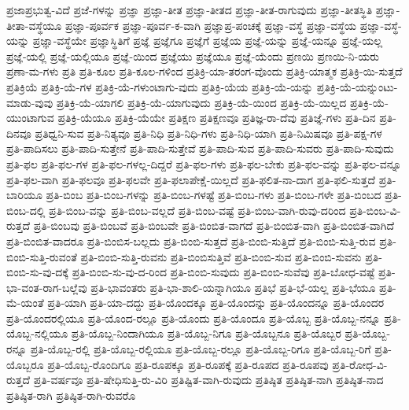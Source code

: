 {ಪ್ರಜಾಪ್ರಭುತ್ವ-ವಿದೆ
ಪ್ರಜೆ-ಗಳನ್ನು
ಪ್ರಜ್ಞಾ
ಪ್ರಜ್ಞಾ-ತೀತ
ಪ್ರಜ್ಞಾ-ತೀತದ
ಪ್ರಜ್ಞಾ-ತೀತ-ರಾಗುವುದು
ಪ್ರಜ್ಞಾ-ತೀತಸ್ಥಿತಿ
ಪ್ರಜ್ಞಾ-ತೀತಾ-ವಸ್ಥೆಯೂ
ಪ್ರಜ್ಞಾ-ಪೂರ್ವಕ
ಪ್ರಜ್ಞಾ-ಪೂರ್ವ-ಕ-ವಾಗಿ
ಪ್ರಜ್ಞಾಪ್ರ-ಪಂಚಕ್ಕೆ
ಪ್ರಜ್ಞಾ-ವಸ್ಥೆ
ಪ್ರಜ್ಞಾ-ವಸ್ಥೆಯ
ಪ್ರಜ್ಞಾ-ವಸ್ಥೆ-ಯನ್ನು
ಪ್ರಜ್ಞಾ-ವಸ್ಥೆಯೇ
ಪ್ರಜ್ಞಾಸ್ಥಿತಿಗೆ
ಪ್ರಜ್ಞೆ
ಪ್ರಜ್ಞೆಗೂ
ಪ್ರಜ್ಞೆಗೆ
ಪ್ರಜ್ಞೆಯ
ಪ್ರಜ್ಞೆ-ಯನ್ನು
ಪ್ರಜ್ಞೆ-ಯನ್ನೂ
ಪ್ರಜ್ಞೆ-ಯಲ್ಲ
ಪ್ರಜ್ಞೆ-ಯಲ್ಲಿ
ಪ್ರಜ್ಞೆ-ಯಲ್ಲಿಯೂ
ಪ್ರಜ್ಞೆ-ಯಿಂದ
ಪ್ರಜ್ಞೆಯು
ಪ್ರಜ್ಞೆಯೂ
ಪ್ರಜ್ಞೆ-ಯೆಂದು
ಪ್ರಣಯಿ
ಪ್ರಣಯಿ-ನಿ-ಯರು
ಪ್ರಣಾ-ಮ-ಗಳು
ಪ್ರತಿ
ಪ್ರತಿ-ಕೂಲ
ಪ್ರತಿ-ಕೂಲ-ಗಳಿಂದ
ಪ್ರತಿಕ್ರಿ-ಯಾ-ತರಂಗ-ವೊಂದು
ಪ್ರತಿಕ್ರಿ-ಯಾತ್ಮಕ
ಪ್ರತಿಕ್ರಿ-ಯಿ-ಸುತ್ತದೆ
ಪ್ರತಿಕ್ರಿಯೆ
ಪ್ರತಿಕ್ರಿ-ಯೆ-ಗಳ
ಪ್ರತಿಕ್ರಿ-ಯೆ-ಗಳುಂಟಾಗು-ವುದು
ಪ್ರತಿಕ್ರಿ-ಯೆಯ
ಪ್ರತಿಕ್ರಿ-ಯೆ-ಯನ್ನು
ಪ್ರತಿಕ್ರಿ-ಯೆ-ಯನ್ನುಂಟು-ಮಾಡು-ವುವು
ಪ್ರತಿಕ್ರಿ-ಯೆ-ಯಾಗಲಿ
ಪ್ರತಿಕ್ರಿ-ಯೆ-ಯಾಗುವುದು
ಪ್ರತಿಕ್ರಿ-ಯೆ-ಯಿಂದ
ಪ್ರತಿಕ್ರಿ-ಯೆ-ಯಿಲ್ಲದ
ಪ್ರತಿಕ್ರಿ-ಯೆ-ಯುಂಟಾಗುವ
ಪ್ರತಿಕ್ರಿ-ಯೆಯೂ
ಪ್ರತಿಕ್ರಿ-ಯೆಯೇ
ಪ್ರತಿಕ್ಷಣ
ಪ್ರತಿಕ್ಷಣವೂ
ಪ್ರತಿಜ್ಞ-ರಾ-ದೆವು
ಪ್ರತಿಜ್ಞೆ-ಗಳು
ಪ್ರತಿ-ದಿನ
ಪ್ರತಿ-ದಿನವೂ
ಪ್ರತಿಧ್ವನಿ-ಸುವ
ಪ್ರತಿ-ನಿತ್ಯವೂ
ಪ್ರತಿ-ನಿಧಿ
ಪ್ರತಿ-ನಿಧಿ-ಗಳು
ಪ್ರತಿ-ನಿಧಿ-ಯಾಗಿ
ಪ್ರತಿ-ನಿಮಿಷವೂ
ಪ್ರತಿ-ಪಕ್ಷ-ಗಳ
ಪ್ರತಿ-ಪಾದಿಸಲು
ಪ್ರತಿ-ಪಾದಿ-ಸುತ್ತೇನೆ
ಪ್ರತಿ-ಪಾದಿ-ಸುತ್ತೇವೆ
ಪ್ರತಿ-ಪಾದಿ-ಸುವ
ಪ್ರತಿ-ಪಾದಿ-ಸುವರು
ಪ್ರತಿ-ಪಾದಿ-ಸುವುದು
ಪ್ರತಿ-ಫಲ
ಪ್ರತಿ-ಫಲ-ಗಳ
ಪ್ರತಿ-ಫಲ-ಗಳಲ್ಲ-ದಿದ್ದರೆ
ಪ್ರತಿ-ಫಲ-ಗಳು
ಪ್ರತಿ-ಫಲ-ಬೇಕು
ಪ್ರತಿ-ಫಲ-ವನ್ನು
ಪ್ರತಿ-ಫಲ-ವನ್ನೂ
ಪ್ರತಿ-ಫಲ-ವಾಗಿ
ಪ್ರತಿ-ಫಲವೂ
ಪ್ರತಿ-ಫಲವೇ
ಪ್ರತಿ-ಫಲಾಪೇಕ್ಷೆ-ಯಿಲ್ಲದೆ
ಪ್ರತಿ-ಫಲಿತ-ನಾ-ದಾಗ
ಪ್ರತಿ-ಫಲಿ-ಸುತ್ತದೆ
ಪ್ರತಿ-ಬಾರಿಯೂ
ಪ್ರತಿ-ಬಿಂಬ
ಪ್ರತಿ-ಬಿಂಬ-ಗಳನ್ನು
ಪ್ರತಿ-ಬಿಂಬ-ಗಳಷ್ಟೆ
ಪ್ರತಿ-ಬಿಂಬ-ಗಳು
ಪ್ರತಿ-ಬಿಂಬ-ಗಳೇ
ಪ್ರತಿ-ಬಿಂಬದ
ಪ್ರತಿ-ಬಿಂಬ-ದಲ್ಲಿ
ಪ್ರತಿ-ಬಿಂಬ-ವನ್ನು
ಪ್ರತಿ-ಬಿಂಬ-ವಲ್ಲದೆ
ಪ್ರತಿ-ಬಿಂಬ-ವಷ್ಟೆ
ಪ್ರತಿ-ಬಿಂಬ-ವಾಗಿ-ರುವು-ದರಿಂದ
ಪ್ರತಿ-ಬಿಂಬ-ವಿ-ರುತ್ತದೆ
ಪ್ರತಿ-ಬಿಂಬವು
ಪ್ರತಿ-ಬಿಂಬವೆ
ಪ್ರತಿ-ಬಿಂಬವೇ
ಪ್ರತಿ-ಬಿಂಬಿತ-ವಾಗದೆ
ಪ್ರತಿ-ಬಿಂಬಿತ-ವಾಗಿ
ಪ್ರತಿ-ಬಿಂಬಿತ-ವಾಗಿದೆ
ಪ್ರತಿ-ಬಿಂಬಿತ-ವಾದರೂ
ಪ್ರತಿ-ಬಿಂಬಿಸ-ಬಲ್ಲದು
ಪ್ರತಿ-ಬಿಂಬಿ-ಸುತ್ತದೆ
ಪ್ರತಿ-ಬಿಂಬಿ-ಸುತ್ತಿದೆ
ಪ್ರತಿ-ಬಿಂಬಿ-ಸುತ್ತಿ-ರುವ
ಪ್ರತಿ-ಬಿಂಬಿ-ಸುತ್ತಿ-ರುವಂತೆ
ಪ್ರತಿ-ಬಿಂಬಿ-ಸುತ್ತಿ-ರುವನು
ಪ್ರತಿ-ಬಿಂಬಿಸುತ್ತಿವೆ
ಪ್ರತಿ-ಬಿಂಬಿ-ಸುವ
ಪ್ರತಿ-ಬಿಂಬಿ-ಸುವನು
ಪ್ರತಿ-ಬಿಂಬಿ-ಸು-ವು-ದಕ್ಕೆ
ಪ್ರತಿ-ಬಿಂಬಿ-ಸು-ವು-ದ-ರಿಂದ
ಪ್ರತಿ-ಬಿಂಬಿ-ಸುವುದು
ಪ್ರತಿ-ಬಿಂಬಿ-ಸುವೆವು
ಪ್ರತಿ-ಬೋಧ-ವಷ್ಟೆ
ಪ್ರತಿ-ಭಾ-ವಂತ-ರಾಗ-ಬಲ್ಲೆವು
ಪ್ರತಿ-ಭಾವಂತರು
ಪ್ರತಿ-ಭಾ-ಶಾಲಿ-ಯನ್ನಾಗಿಯೂ
ಪ್ರತಿಭೆ
ಪ್ರತಿ-ಭೆ-ಯಲ್ಲ
ಪ್ರತಿ-ಭೆಯೂ
ಪ್ರತಿ-ಮೆ-ಯಂತೆ
ಪ್ರತಿ-ಯಾಗಿ
ಪ್ರತಿ-ಯಾ-ದದ್ದು
ಪ್ರತಿ-ಯೊಂದಕ್ಕೂ
ಪ್ರತಿ-ಯೊಂದನ್ನು
ಪ್ರತಿ-ಯೊಂದನ್ನೂ
ಪ್ರತಿ-ಯೊಂದರ
ಪ್ರತಿ-ಯೊಂದರಲ್ಲಿಯೂ
ಪ್ರತಿ-ಯೊಂದ-ರಲ್ಲೂ
ಪ್ರತಿ-ಯೊಂದು
ಪ್ರತಿ-ಯೊಂದೂ
ಪ್ರತಿ-ಯೊಬ್ಬ
ಪ್ರತಿ-ಯೊಬ್ಬ-ನನ್ನೂ
ಪ್ರತಿ-ಯೊಬ್ಬ-ನಲ್ಲಿಯೂ
ಪ್ರತಿ-ಯೊಬ್ಬ-ನಿಂದಾಗಿಯೂ
ಪ್ರತಿ-ಯೊಬ್ಬ-ನಿಗೂ
ಪ್ರತಿ-ಯೊಬ್ಬನೂ
ಪ್ರತಿ-ಯೊಬ್ಬರ
ಪ್ರತಿ-ಯೊಬ್ಬ-ರನ್ನೂ
ಪ್ರತಿ-ಯೊಬ್ಬ-ರಲ್ಲಿ
ಪ್ರತಿ-ಯೊಬ್ಬ-ರಲ್ಲಿಯೂ
ಪ್ರತಿ-ಯೊಬ್ಬ-ರಲ್ಲೂ
ಪ್ರತಿ-ಯೊಬ್ಬ-ರಿಗೂ
ಪ್ರತಿ-ಯೊಬ್ಬ-ರಿಗೆ
ಪ್ರತಿ-ಯೊಬ್ಬರೂ
ಪ್ರತಿ-ಯೊಬ್ಬ-ರೊಂದಿಗೂ
ಪ್ರತಿ-ರೂಪಕ್ಕೂ
ಪ್ರತಿ-ರೂಪಕ್ಕೆ
ಪ್ರತಿ-ರೂಪದ
ಪ್ರತಿ-ರೂಪವು
ಪ್ರತಿ-ರೋಧ-ವಿ-ರುತ್ತದೆ
ಪ್ರತಿ-ವರ್ಷವೂ
ಪ್ರತಿ-ಷೇಧಿಸುತ್ತಿ-ರು-ವಿರಿ
ಪ್ರತಿಷ್ಟಿತ-ವಾಗಿ-ರುವುದು
ಪ್ರತಿಷ್ಠಿತ
ಪ್ರತಿಷ್ಠಿತ-ನಾಗಿ
ಪ್ರತಿಷ್ಠಿತ-ನಾದ
ಪ್ರತಿಷ್ಠಿತ-ರಾಗಿ
ಪ್ರತಿಷ್ಠಿತ-ರಾಗಿ-ರುವರೊ
}
